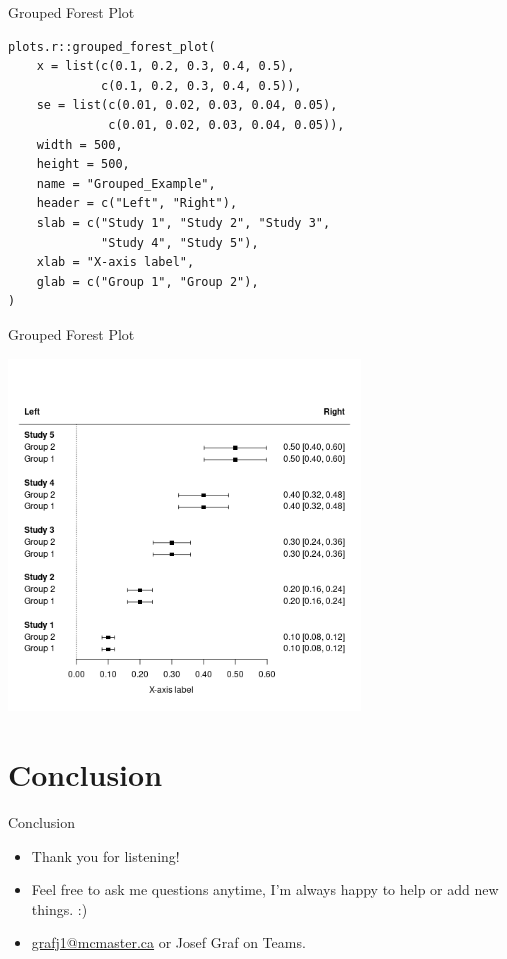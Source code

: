\documentclass[10pt,handout]{beamer}
\begin{document}
\begin{frame}[fragile]{Grouped Forest Plot}
  \begin{verbatim}
plots.r::grouped_forest_plot(
    x = list(c(0.1, 0.2, 0.3, 0.4, 0.5),
             c(0.1, 0.2, 0.3, 0.4, 0.5)),
    se = list(c(0.01, 0.02, 0.03, 0.04, 0.05),
              c(0.01, 0.02, 0.03, 0.04, 0.05)),
    width = 500,
    height = 500,
    name = "Grouped_Example",
    header = c("Left", "Right"),
    slab = c("Study 1", "Study 2", "Study 3",
             "Study 4", "Study 5"),
    xlab = "X-axis label",
    glab = c("Group 1", "Group 2"),
)
\end{verbatim}
\end{frame}

\begin{frame}{Grouped Forest Plot}
  \begin{center}
    \includegraphics[width=0.7\textwidth]{Grouped_Example.png}
  \end{center}
\end{frame}

\section[Conclusion]{Conclusion}

\begin{frame}{Conclusion}
  \begin{itemize}[<+->]
    \item Thank you for listening!
    \item Feel free to ask me questions anytime, I'm always happy to help or add new things. :)
    \item \hyperlink{mailto:grafj1@mcmaster.ca}{grafj1@mcmaster.ca} or Josef Graf on Teams.
  \end{itemize}
\end{frame}
\end{document}

